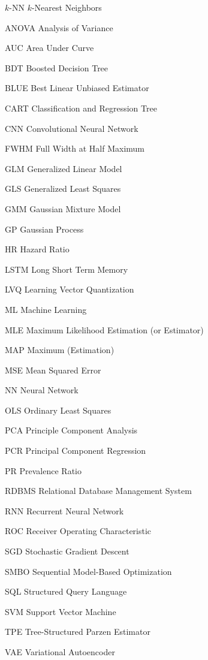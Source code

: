 \begin{symbollist}
	\item[$k$-NN] $k$-Nearest Neighbors
	\item[ANOVA] Analysis of Variance
	\item[AUC] Area Under Curve
	\item[BDT] Boosted Decision Tree
	\item[BLUE] Best Linear Unbiased Estimator
	\item[CART] Classification and Regression Tree
	\item[CNN] Convolutional Neural Network
	\item[FWHM] Full Width at Half Maximum
	\item[GLM] Generalized Linear Model
	\item[GLS] Generalized Least Squares
	\item[GMM] Gaussian Mixture Model
	\item[GP] Gaussian Process
	\item[HR] Hazard Ratio
	\item[LSTM] Long Short Term Memory
	\item[LVQ] Learning Vector Quantization
	\item[ML] Machine Learning
	\item[MLE] Maximum Likelihood Estimation (or Estimator)
	\item[MAP] Maximum \aposteriori (Estimation)
	\item[MSE] Mean Squared Error
	\item[NN] Neural Network
	\item[OLS] Ordinary Least Squares
	\item[PCA] Principle Component Analysis
	\item[PCR] Principal Component Regression
	\item[PR] Prevalence Ratio
	\item[RDBMS] Relational Database Management System
	\item[RNN] Recurrent Neural Network
	\item[ROC] Receiver Operating Characteristic
	\item[SGD] Stochastic Gradient Descent
	\item[SMBO] Sequential Model-Based Optimization
	\item[SQL] Structured Query Language
	\item[SVM] Support Vector Machine
	\item[TPE] Tree-Structured Parzen Estimator
	\item[VAE] Variational Autoencoder
\end{symbollist}

